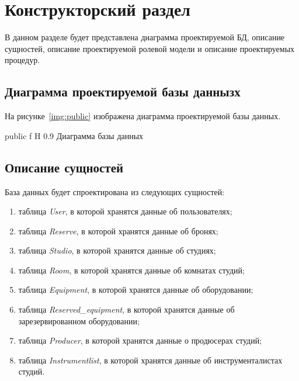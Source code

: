 \chapter{Конструкторский раздел}

В данном разделе будет представлена диаграмма проектируемой БД, описание сущностей, описание проектируемой ролевой модели и описание проектируемых процедур.

\section{Диаграмма проектируемой базы даннызх}
На рисунке~\ref{img:public} изображена диаграмма проектируемой базы данных.



{public} %
{f} %
{H} %
{0.9\textwidth} %
{Диаграмма базы данных} %


\section{Описание сущностей}
База данных будет спроектирована из следующих сущностей:
\begin{enumerate}
	\item таблица \textit{User}, в которой хранятся данные об пользователях;
	\item таблица \textit{Reserve}, в которой хранятся данные об бронях;
	\item таблица \textit{Studio}, в которой хранятся данные об студиях;
	\item таблица \textit{Room}, в которой хранятся данные об комнатах студий;
	\item таблица \textit{Equipment}, в которой хранятся данные об оборудовании;
	\item таблица \textit{Reserved\_equipment}, в которой хранятся данные об зарезервированном оборудовании;
	\item таблица \textit{Producer}, в которой хранятся данные о продюсерах студий;
	\item таблица \textit{Instrumentlist}, в которой хранятся данные об инструменталистах студий.
\end{enumerate}
